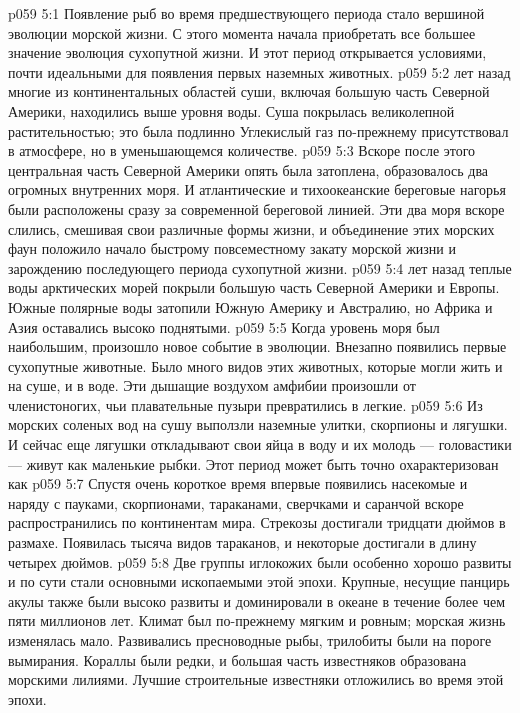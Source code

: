 \vs p059 5:1 Появление рыб во время предшествующего периода стало вершиной эволюции морской жизни. С этого момента начала приобретать все большее значение эволюция сухопутной жизни. И этот период открывается условиями, почти идеальными для появления первых наземных животных.
\vs p059 5:2 \pc {} лет назад многие из континентальных областей суши, включая большую часть Северной Америки, находились выше уровня воды. Суша покрылась великолепной растительностью; это была подлинно  Углекислый газ по\hyp{}прежнему присутствовал в атмосфере, но в уменьшающемся количестве.
\vs p059 5:3 Вскоре после этого центральная часть Северной Америки опять была затоплена, образовалось два огромных внутренних моря. И атлантические и тихоокеанские береговые нагорья были расположены сразу за современной береговой линией. Эти два моря вскоре слились, смешивая свои различные формы жизни, и объединение этих морских фаун положило начало быстрому повсеместному закату морской жизни и зарождению последующего периода сухопутной жизни.
\vs p059 5:4 \pc {} лет назад теплые воды арктических морей покрыли большую часть Северной Америки и Европы. Южные полярные воды затопили Южную Америку и Австралию, но Африка и Азия оставались высоко поднятыми.
\vs p059 5:5 Когда уровень моря был наибольшим,  произошло новое событие в эволюции. Внезапно появились первые сухопутные животные. Было много видов этих животных, которые могли жить и на суше, и в воде. Эти дышащие воздухом амфибии произошли от членистоногих, чьи плавательные пузыри превратились в легкие.
\vs p059 5:6 Из морских соленых вод на сушу выползли наземные улитки, скорпионы и лягушки. И сейчас еще лягушки откладывают свои яйца в воду и их молодь --- головастики --- живут как маленькие рыбки. Этот период может быть точно охарактеризован как 
\vs p059 5:7 Спустя очень короткое время впервые появились насекомые и наряду с пауками, скорпионами, тараканами, сверчками и саранчой вскоре распространились по континентам мира. Стрекозы достигали тридцати дюймов в размахе. Появилась тысяча видов тараканов, и некоторые достигали в длину четырех дюймов.
\vs p059 5:8 Две группы иглокожих были особенно хорошо развиты и по сути стали основными ископаемыми этой эпохи. Крупные, несущие панцирь акулы также были высоко развиты и доминировали в океане в течение более чем пяти миллионов лет. Климат был по\hyp{}прежнему мягким и ровным; морская жизнь изменялась мало. Развивались пресноводные рыбы, трилобиты были на пороге вымирания. Кораллы были редки, и большая часть известняков образована морскими лилиями. Лучшие строительные известняки отложились во время этой эпохи.
